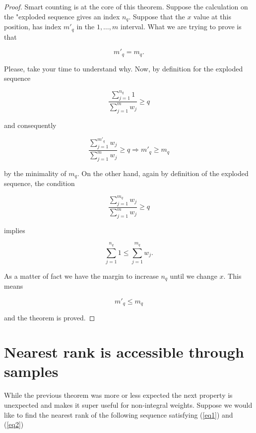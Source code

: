 \documentclass[a4paper,11pt]{article} %
\theoremstyle{definition}
\theoremstyle{remark}
\begin{document}
\begin{proof}
Smart counting is at the core of this theorem. Suppose the calculation on the "exploded sequence gives an index $n_{q}$. Suppose that the $x$ value at this position, has index $m'_{q}$ in the $1,\ldots,m$ interval. 
What we are trying to prove is that

\begin{equation}
m'_{q} = m_{q}.
\end{equation}

Please, take your time to understand why. Now, by definition for the exploded sequence

\begin{equation}
 \frac{\sum_{j=1}^{n_{q}} 1}{\sum_{j=1}^{m} w_{j}} \ge q
\end{equation}

and consequently

\begin{equation}
 \frac{\sum_{j=1}^{m'_{q}} w_{j}}{\sum_{j=1}^{m} w_{j}} \ge q \Rightarrow  m'_{q} \ge m_{q}
\end{equation}

by the minimality of $m_{q}$. On the other hand, again by definition of the exploded sequence, the condition

\begin{equation}
\frac{\sum_{j=1}^{m_{q}} w_{j}}{\sum_{j=1}^{m} w_{j}} \ge q 
\end{equation}

implies 

\begin{equation}
\sum_{j=1}^{n_{q}} 1  \le \sum_{j=1}^{m_{q}} w_{j}.
\end{equation}

As a matter of fact we have the margin to increase $n_{q}$ until we change $x$. This means

\begin{equation}
m'_{q} \le m_{q}
\end{equation}

and the theorem is proved.
\end{proof}

\section{Nearest rank is accessible through samples}
While the previous theorem was more or less expected the next property is unexpected and makes it super useful for non-integral weights. Suppose we would like to find the nearest rank of the following sequence satisfying (\ref{eq1}) and (\ref{eq2})
\end{document}
